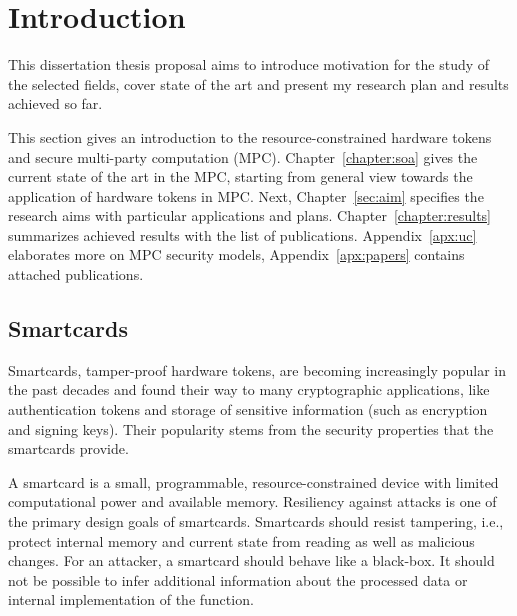 \documentclass[
  digital, %
  twoside, %
  table,   %
  lof,     %
  lot,     %
]{fithesis3}
\newcounter{ph4_show_guides}
\theoremstyle{definition}
\theoremstyle{remark}
\begin{document}
\setlength{\marginparwidth}{2.5cm}   %
\setcounter{biburlnumpenalty}{5000}  %


\chapter{Introduction}\label{sec:intro}

This dissertation thesis proposal aims to introduce motivation for the study of the selected fields, cover state of the art and present my research plan and results achieved so far.

This section gives an introduction to the resource-constrained hardware tokens and secure multi-party computation (MPC). Chapter~\ref{chapter:soa} gives the current state of the art in the MPC, starting from general view towards the application of hardware tokens in MPC. Next, Chapter~\ref{sec:aim} specifies the research aims with particular applications and plans. Chapter~\ref{chapter:results} summarizes achieved results with the list of publications. Appendix~\ref{apx:uc} elaborates more on MPC security models, Appendix~\ref{apx:papers} contains attached publications.

\section{Smartcards}
Smartcards, tamper-proof hardware tokens, are becoming increasingly popular in the past decades and found their way to many cryptographic applications, like authentication tokens and storage of sensitive information (such as encryption and signing keys). Their popularity stems from the security properties that the smartcards provide. 

A smartcard is a small, programmable, resource-constrained device with limited computational power and available memory. Resiliency against attacks is one of the primary design goals of smartcards.
Smartcards should resist tampering, i.e., protect internal memory and current state from reading as well as malicious changes. For an attacker, a smartcard should behave like a black-box. It should not be possible to infer additional information about the processed data or internal implementation of the function.
\end{document}
